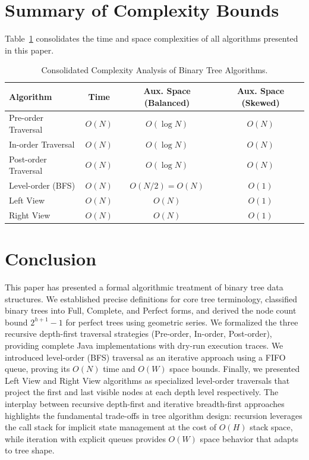 \documentclass[10pt,journal,compsoc,onecolumn]{IEEEtran}
\begin{document}
\section{Summary of Complexity Bounds}

Table~\ref{tab:complexity_summary} consolidates the time and space complexities of all algorithms presented in this paper.

\begin{table}[htbp]
\centering
\caption{Consolidated Complexity Analysis of Binary Tree Algorithms.}
\label{tab:complexity_summary}
\begin{tabular}{lccc}
\toprule
Algorithm & Time & Aux. Space (Balanced) & Aux. Space (Skewed) \\
\midrule
Pre-order Traversal & $O(N)$ & $O(\log N)$ & $O(N)$ \\
In-order Traversal & $O(N)$ & $O(\log N)$ & $O(N)$ \\
Post-order Traversal & $O(N)$ & $O(\log N)$ & $O(N)$ \\
Level-order (BFS) & $O(N)$ & $O(N/2) = O(N)$ & $O(1)$ \\
Left View & $O(N)$ & $O(N)$ & $O(1)$ \\
Right View & $O(N)$ & $O(N)$ & $O(1)$ \\
\bottomrule
\end{tabular}
\end{table}

\section{Conclusion}
This paper has presented a formal algorithmic treatment of binary tree data structures. We established precise definitions for core tree terminology, classified binary trees into Full, Complete, and Perfect forms, and derived the node count bound $2^{h+1} - 1$ for perfect trees using geometric series. We formalized the three recursive depth-first traversal strategies (Pre-order, In-order, Post-order), providing complete Java implementations with dry-run execution traces. We introduced level-order (BFS) traversal as an iterative approach using a FIFO queue, proving its $O(N)$ time and $O(W)$ space bounds. Finally, we presented Left View and Right View algorithms as specialized level-order traversals that project the first and last visible nodes at each depth level respectively. The interplay between recursive depth-first and iterative breadth-first approaches highlights the fundamental trade-offs in tree algorithm design: recursion leverages the call stack for implicit state management at the cost of $O(H)$ stack space, while iteration with explicit queues provides $O(W)$ space behavior that adapts to tree shape.
\end{document}

